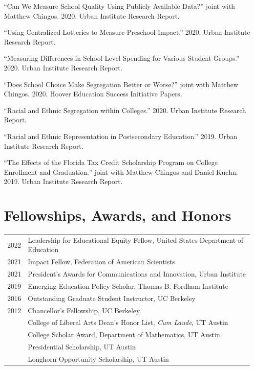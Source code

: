 \documentclass[11pt,letterpaper]{article}
\begin{document}
\medskip

``Can We Measure School Quality Using Publicly Available Data?'' joint with Matthew Chingos. 2020. Urban Institute Research Report.

\medskip

``Using Centralized Lotteries to Measure Preschool Impact.'' 2020. Urban Institute Research Report.

\medskip

``Measuring Differences in School-Level Spending for Various Student Groups.'' 2020. Urban Institute Research Report.

\medskip

``Does School Choice Make Segregation Better or Worse?'' joint with Matthew Chingos. 2020. Hoover Education Success Initiative Papers.

\medskip

``Racial and Ethnic Segregation within Colleges.'' 2020. Urban Institute Research Report.

\medskip

``Racial and Ethnic Representation in Postsecondary Education.'' 2019. Urban Institute Research Report.

\medskip

``The Effects of the Florida Tax Credit Scholarship Program on College Enrollment and Graduation,'' joint with Matthew Chingos and Daniel Kuehn. 2019. Urban Institute Research Report.

\section*{Fellowships, Awards, and Honors}

\begin{tabular}{ll}
2022 & Leadership for Educational Equity Fellow, United States Department of Education \\
2021 & Impact Fellow, Federation of American Scientists \\
2021 & President's Awards for Communications and Innovation, Urban Institute \\
2019 & Emerging Education Policy Scholar, Thomas B. Fordham Institute \\
2016 & Outstanding Graduate Student Instructor, UC Berkeley \\
2012 & Chancellor's Fellowship, UC Berkeley \\
& College of Liberal Arts Dean's Honor List, \textit{Cum Laude}, UT Austin \\
& College Scholar Award, Department of Mathematics, UT Austin \\
& Presidential Scholarship, UT Austin \\
& Longhorn Opportunity Scholarship, UT Austin \\
\end{tabular}
\end{document}
